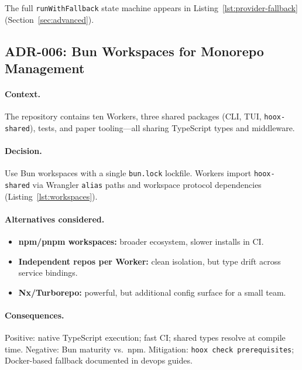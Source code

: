 
The full \texttt{runWithFallback} state machine appears in Listing~\ref{lst:provider-fallback} (Section~\ref{sec:advanced}).

\subsection{ADR-006: Bun Workspaces for Monorepo Management}

\paragraph{Context.} The repository contains ten Workers, three shared packages (CLI, TUI, \texttt{hoox-shared}), tests, and paper tooling---all sharing TypeScript types and middleware.

\paragraph{Decision.} Use Bun workspaces with a single \texttt{bun.lock} lockfile. Workers import \texttt{hoox-shared} via Wrangler \texttt{alias} paths and workspace protocol dependencies (Listing~\ref{lst:workspaces}).

\paragraph{Alternatives considered.}
\begin{itemize}
  \item \textbf{npm/pnpm workspaces:} broader ecosystem, slower installs in CI.
  \item \textbf{Independent repos per Worker:} clean isolation, but type drift across service bindings.
  \item \textbf{Nx/Turborepo:} powerful, but additional config surface for a small team.
\end{itemize}

\paragraph{Consequences.} Positive: native TypeScript execution; fast CI; shared types resolve at compile time. Negative: Bun maturity vs.\ npm. Mitigation: \texttt{hoox check prerequisites}; Docker-based fallback documented in devops guides.

